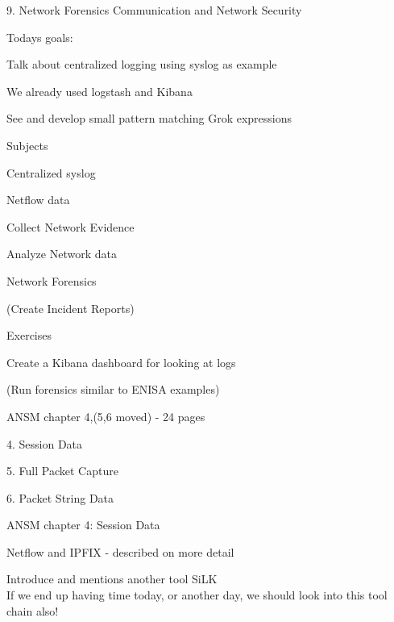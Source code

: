 \documentclass[Screen16to9,17pt]{foils}
\begin{document}
\mytitlepage
{9. Network Forensics}
{Communication and Network Security \the\year}




Todays goals:
\begin{list2}
\item Talk about centralized logging using syslog as example
\item We already used logstash and Kibana
\item See and develop small pattern matching Grok expressions
\end{list2}



\begin{list1}
\item Subjects
\begin{list2}
\item Centralized syslog
\item Netflow data
\item Collect Network Evidence
\item Analyze Network data
\item Network Forensics
\item (Create Incident Reports)
\end{list2}
\item Exercises
\begin{list2}
\item Create a Kibana dashboard for looking at logs
\item (Run forensics similar to ENISA examples)

\end{list2}
\end{list1}


\begin{list1}
\item ANSM chapter 4,(5,6 moved) - 24 pages
\item 4. Session Data
\item 5. Full Packet Capture
\item 6. Packet String Data
\end{list1}




\begin{list1}
\item ANSM chapter 4: Session Data
\begin{list2}
\item Netflow and IPFIX - described on more detail
\item Introduce and mentions another tool SiLK \\
If we end up having time today, or another day, we should look into this tool chain also!
\end{list2}
\end{list1}
\end{document}
